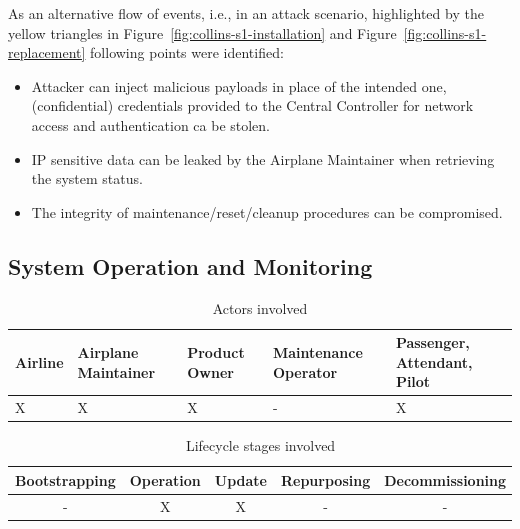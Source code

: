 As an alternative flow of events, i.e., in an attack scenario, highlighted by the yellow triangles in
Figure~\ref{fig:collins-s1-installation} and Figure~\ref{fig:collins-s1-replacement} following points were identified:

\begin{itemize}
	\item Attacker can inject malicious payloads in place of the intended one, (confidential) credentials provided
	      to the Central Controller for network access and authentication ca be stolen.
	\item IP sensitive data can be leaked by the Airplane Maintainer when retrieving the system status.
	\item The integrity of maintenance/reset/cleanup procedures can be compromised.
\end{itemize}


\subsection{System Operation and Monitoring} %
\label{sub:System Operation and Monitoring}

\begin{table}
	\caption{Actors involved}
	\label{tab:Actors involved}
	\begin{center}
		\begin{tabular}{ |p{2.5cm}|p{2.5cm}|p{2.5cm}|p{2.5cm}|p{2.5cm}| }
			\hline
			Airline & Airplane Maintainer & Product Owner & Maintenance Operator & Passenger, Attendant, Pilot \\
			\hline
			X       & X                   & X             & -                    & X                           \\
			\hline
		\end{tabular}
	\end{center}
\end{table}

\begin{table}
	\caption{Lifecycle stages involved}
	\label{tab:Lifecycle stages involved}
	\begin{center}
		\begin{tabular}{ |c|c|c|c|c| }
			\hline
			Bootstrapping & Operation & Update & Repurposing & Decommissioning \\
			\hline
			-             & X         & X      & -           & -               \\
			\hline
		\end{tabular}
	\end{center}
\end{table}

